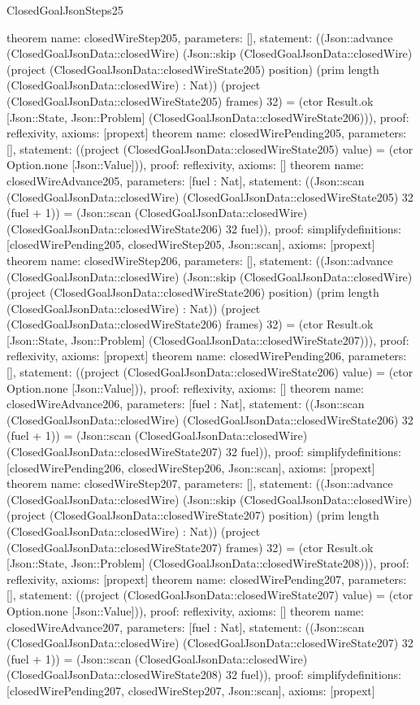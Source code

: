\begin{lexlean}{ClosedGoalJsonSteps25}
\begin{semanticmodule}
{}
theorem{
 name: closedWireStep205, parameters: [],
 statement: ((Json::advance (ClosedGoalJsonData::closedWire) (Json::skip (ClosedGoalJsonData::closedWire) (project (ClosedGoalJsonData::closedWireState205) position) (prim length (ClosedGoalJsonData::closedWire) : Nat)) (project (ClosedGoalJsonData::closedWireState205) frames) 32) = (ctor Result.ok [Json::State, Json::Problem] (ClosedGoalJsonData::closedWireState206))), proof: reflexivity{}, axioms: [propext]
}
theorem{
 name: closedWirePending205, parameters: [],
 statement: ((project (ClosedGoalJsonData::closedWireState205) value) = (ctor Option.none [Json::Value])), proof: reflexivity{}, axioms: []
}
theorem{
 name: closedWireAdvance205, parameters: [fuel : Nat],
 statement: ((Json::scan (ClosedGoalJsonData::closedWire) (ClosedGoalJsonData::closedWireState205) 32 (fuel + 1)) = (Json::scan (ClosedGoalJsonData::closedWire) (ClosedGoalJsonData::closedWireState206) 32 fuel)), proof: simplify{definitions: [closedWirePending205, closedWireStep205, Json::scan]}, axioms: [propext]
}
theorem{
 name: closedWireStep206, parameters: [],
 statement: ((Json::advance (ClosedGoalJsonData::closedWire) (Json::skip (ClosedGoalJsonData::closedWire) (project (ClosedGoalJsonData::closedWireState206) position) (prim length (ClosedGoalJsonData::closedWire) : Nat)) (project (ClosedGoalJsonData::closedWireState206) frames) 32) = (ctor Result.ok [Json::State, Json::Problem] (ClosedGoalJsonData::closedWireState207))), proof: reflexivity{}, axioms: [propext]
}
theorem{
 name: closedWirePending206, parameters: [],
 statement: ((project (ClosedGoalJsonData::closedWireState206) value) = (ctor Option.none [Json::Value])), proof: reflexivity{}, axioms: []
}
theorem{
 name: closedWireAdvance206, parameters: [fuel : Nat],
 statement: ((Json::scan (ClosedGoalJsonData::closedWire) (ClosedGoalJsonData::closedWireState206) 32 (fuel + 1)) = (Json::scan (ClosedGoalJsonData::closedWire) (ClosedGoalJsonData::closedWireState207) 32 fuel)), proof: simplify{definitions: [closedWirePending206, closedWireStep206, Json::scan]}, axioms: [propext]
}
theorem{
 name: closedWireStep207, parameters: [],
 statement: ((Json::advance (ClosedGoalJsonData::closedWire) (Json::skip (ClosedGoalJsonData::closedWire) (project (ClosedGoalJsonData::closedWireState207) position) (prim length (ClosedGoalJsonData::closedWire) : Nat)) (project (ClosedGoalJsonData::closedWireState207) frames) 32) = (ctor Result.ok [Json::State, Json::Problem] (ClosedGoalJsonData::closedWireState208))), proof: reflexivity{}, axioms: [propext]
}
theorem{
 name: closedWirePending207, parameters: [],
 statement: ((project (ClosedGoalJsonData::closedWireState207) value) = (ctor Option.none [Json::Value])), proof: reflexivity{}, axioms: []
}
theorem{
 name: closedWireAdvance207, parameters: [fuel : Nat],
 statement: ((Json::scan (ClosedGoalJsonData::closedWire) (ClosedGoalJsonData::closedWireState207) 32 (fuel + 1)) = (Json::scan (ClosedGoalJsonData::closedWire) (ClosedGoalJsonData::closedWireState208) 32 fuel)), proof: simplify{definitions: [closedWirePending207, closedWireStep207, Json::scan]}, axioms: [propext]
}
\end{semanticmodule}
\end{lexlean}
